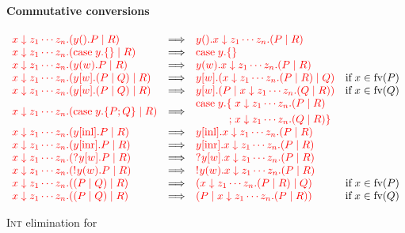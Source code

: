 \begin{figure*}[h]
  \paragraph*{Commutative conversions}
  \(
  \begin{array}{lclr}
    \red{ \intl{x}{z_1 \cdots z_n}(\wait{y}P \mid R) }
    &\Longrightarrow&
    \red{ \wait{y}\intl{x}{z_1 \cdots z_n}(P \mid R) }
    \\
    \red{ \intl{x}{z_1\cdots z_n}(\case{y}{}{} \mid R) }
    &\Longrightarrow&
    \red{ \case{y}{}{} }
    \\
    \red{ \intl{x}{z_1 \cdots z_n}(\recv{y}{w}P \mid R) }
    &\Longrightarrow&
    \red{ \recv{y}{w}\intl{x}{z_1 \cdots z_n}(P \mid R) }
    \\
    \red{ \intl{x}{z_1 \cdots z_n}(\send{y}{w}(P \mid Q) \mid R) }
    &\Longrightarrow&        
    \red{ \send{y}{w}(\intl{x}{z_1 \cdots z_n}(P \mid R) \mid Q) }
    &\text{if} \; x \in \text{fv}(P)
    \\
    \red{ \intl{x}{z_1 \cdots z_n}(\send{y}{w}(P \mid Q) \mid R) }
    &\Longrightarrow&        
    \red{ \send{y}{w}(P \mid \intl{x}{z_1 \cdots z_n}(Q \mid R)) }
    &\text{if} \; x \in \text{fv}(Q)
    \\
    \red{ \intl{x}{z_1 \cdots z_n}(\case{y}{P}{Q} \mid R) }
    &\Longrightarrow&
    \!\begin{aligned}
      \red{ \text{case}\;y.}
      \red{ \{\;}& \red{ \intl{x}{z_1 \cdots z_n}(P \mid R) } \\
      \red{  ;\;}& \red{ \intl{x}{z_1 \cdots z_n}(Q \mid R) \}}
    \end{aligned}
    \\
    \red{ \intl{x}{z_1 \cdots z_n}(\inl{y}P \mid R) }
    &\Longrightarrow&
    \red{ \inl{y}\intl{x}{z_1 \cdots z_n}(P \mid R) }      
    \\
    \red{ \intl{x}{z_1 \cdots z_n}(\inr{y}P \mid R) }
    &\Longrightarrow&
    \red{ \inr{y}\intl{x}{z_1 \cdots z_n}(P \mid R) }      
    \\
    \red{ \intl{x}{z_1 \cdots z_n}(\give{\send{y}{w}}P \mid R) }
    &\Longrightarrow&
    \red{ \give{\send{y}{w}}\intl{x}{z_1 \cdots z_n}(P \mid R) }
    \\ 
    \red{ \intl{x}{z_1 \cdots z_n}(\take{\recv{y}{w}}P \mid R) }
    &\Longrightarrow&
    \red{ \take{\recv{y}{w}}\intl{x}{z_1 \cdots z_n}(P \mid R) }
    \\ 
    \red{ \intl{x}{z_1 \cdots z_n}((P \mid Q) \mid R) }
    &\Longrightarrow&
    \red{ (\intl{x}{z_1 \cdots z_n}(P \mid R) \mid Q) } 
    &\text{if} \; x \in \text{fv}(P)
    \\ 
    \red{ \intl{x}{z_1 \cdots z_n}((P \mid Q) \mid R) }
    &\Longrightarrow&
    \red{ (P \mid \intl{x}{z_1 \cdots z_n}(P \mid R)) } 
    &\text{if} \; x \in \text{fv}(Q)
  \end{array}
  \)   
  \caption{\textsc{Int} elimination for \nodcap}
  \label{fig:nodcap-intl}
\end{figure*}
